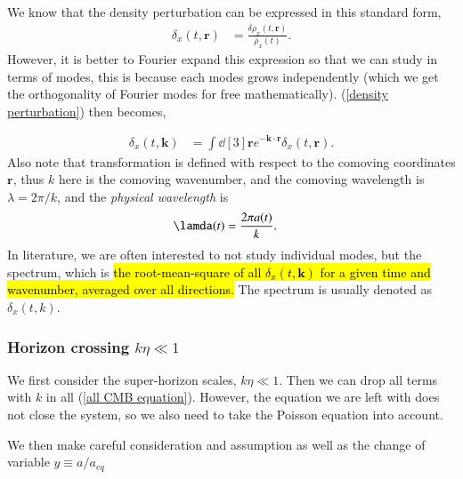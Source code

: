 \documentclass[a4paper, 12pt]{article}
\begin{document}
{{      We know that the density perturbation can be expressed in this
      standard form, 
      \begin{align}
        \label{density perturbation}
        \delta_x(t, \textbf{r}) &=  \frac{\delta \rho_{x}(t,
        \textbf{r})}{\bar{\rho}_{x}(t)}.
      \end{align}
      However, it is better to Fourier expand this expression so that we
      can study in terms of modes, this is because each modes grows
      independently (which we get the orthogonality of Fourier modes
      for free mathematically). (\ref{density perturbation}) then
      becomes, 
      
      \begin{align}
        \label{fourier density perturbation}
        \delta_{x}(t, \textbf{k}) &= \int \dd[3]{\textbf{r}} e^{-
        \textbf{k} \cdot \textbf{r}} \delta_{x} (t, \textbf{r}).  
      \end{align}
      Also note that transformation is defined with respect to the
      comoving coordinates \( \textbf{r} \), thus \( k \) here is the
      comoving wavenumber, and the comoving wavelength is \( \lambda
      =  2 \pi  / k \), and the \textit{physical wavelength} is 
      \begin{align}
        \label{physical wavelength}
        \lamda (t) &=  \frac{2 \pi a(t)}{k}.
      \end{align}
      In literature, we are often interested to not study
      individual modes, but the spectrum, which is \hl{the
      root-mean-square of all $ \delta_x (t, \textbf{k}) $ for a given
      time and wavenumber, averaged over all directions.} The
        spectrum is usually denoted as \(  \delta_x (t,k) \). 
    


        \subsubsection{Horizon crossing $k\eta \ll 1$}%
          \label{sub:ketall1}
          
        We first consider the super-horizon scales, \( k \eta \ll 1
        \). Then we can drop all terms with \( k \) in all
        (\ref{all CMB equation}). However, the equation we are left
        with does not close the system, so we also need to take the
        Poisson equation into account. 

        We then make careful consideration and assumption as well
        as the change of variable \( y \equiv a / a_{eq} \)


}}
\end{document}
